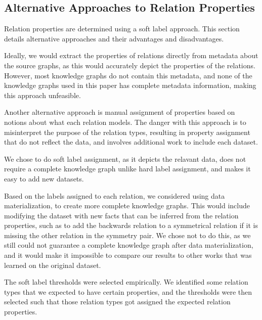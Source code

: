 \subsection{Alternative Approaches to Relation Properties}
Relation properties are determined using a soft label approach. This section details alternative approaches and their advantages and disadvantages.

Ideally, we would extract the properties of relations directly from metadata about the source graphs, as this would accurately depict the properties of the relations. However, most knowledge graphs do not contain this metadata, and none of the knowledge graphs used in this paper has complete metadata information, making this approach unfeasible.

Another alternative approach is manual assignment of properties based on notions about what each relation models. The danger with this approach is to misinterpret the purpose of the relation types, resulting in property assignment that do not reflect the data, and involves additional work to include each dataset.

We chose to do soft label assignment, as it depicts the relavant data, does not require a complete knowledge graph unlike hard label assignment, and makes it easy to add new datasets.

Based on the labels assigned to each relation, we considered using data materialization, to create more complete knowledge graphs. This would include modifying the dataset with new facts that can be inferred from the relation properties, such as to add the backwards relation to a symmetrical relation if it is missing the other relation in the symmetry pair. We chose not to do this, as we still could not guarantee a complete knowledge graph after data materialization, and it would make it impossible to compare our results to other works that was learned on the original dataset.

The soft label thresholds were selected empirically. We identified some relation types that we expected to have certain properties, and the thresholds were then selected such that those relation types got assigned the expected relation properties.